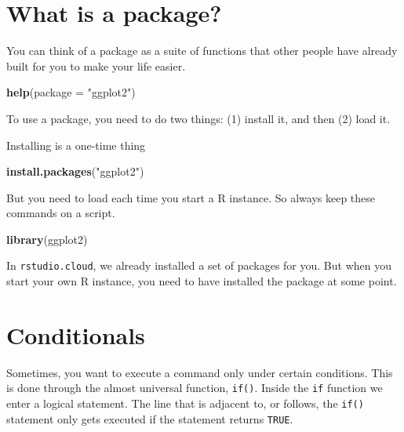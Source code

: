 \documentclass[
]{book}
\newenvironment{Shaded}{\begin{snugshade}}{\end{snugshade}}
\newcommand{\DataTypeTok}[1]{\textcolor[rgb]{0.13,0.29,0.53}{#1}}
\newcommand{\KeywordTok}[1]{\textcolor[rgb]{0.13,0.29,0.53}{\textbf{#1}}}
\newcommand{\NormalTok}[1]{#1}
\newcommand{\StringTok}[1]{\textcolor[rgb]{0.31,0.60,0.02}{#1}}
\theoremstyle{definition}
\theoremstyle{definition}
\theoremstyle{definition}
\theoremstyle{remark}
\begin{document}
\hypertarget{what-is-a-package}{%
\section{What is a package?}\label{what-is-a-package}}

You can think of a package as a suite of functions that other people have already built for you to make your life easier.

\begin{Shaded}
\begin{Highlighting}[]
\KeywordTok{help}\NormalTok{(}\DataTypeTok{package =} \StringTok{"ggplot2"}\NormalTok{)}
\end{Highlighting}
\end{Shaded}

To use a package, you need to do two things: (1) install it, and then (2) load it.

Installing is a one-time thing

\begin{Shaded}
\begin{Highlighting}[]
\KeywordTok{install.packages}\NormalTok{(}\StringTok{"ggplot2"}\NormalTok{)}
\end{Highlighting}
\end{Shaded}

But you need to load each time you start a R instance. So always keep these commands on a script.

\begin{Shaded}
\begin{Highlighting}[]
\KeywordTok{library}\NormalTok{(ggplot2)}
\end{Highlighting}
\end{Shaded}

In \texttt{rstudio.cloud}, we already installed a set of packages for you. But when you start your own R instance, you need to have installed the package at some point.

\hypertarget{conditionals}{%
\section{Conditionals}\label{conditionals}}

Sometimes, you want to execute a command only under certain conditions. This is done through the almost universal function, \texttt{if()}. Inside the \texttt{if} function we enter a logical statement. The line that is adjacent to, or follows, the \texttt{if()} statement only gets executed if the statement returns \texttt{TRUE}.
\end{document}
